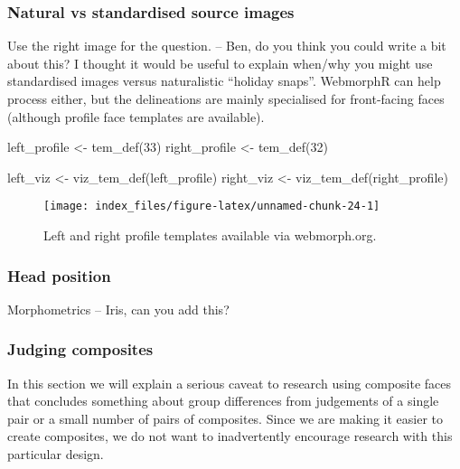 \documentclass[
  doc,floatsintext]{apa6}
\newenvironment{Shaded}{\begin{snugshade}}{\end{snugshade}}
\newcommand{\DecValTok}[1]{\textcolor[rgb]{0.00,0.00,0.81}{#1}}
\newcommand{\FunctionTok}[1]{\textcolor[rgb]{0.00,0.00,0.00}{#1}}
\newcommand{\NormalTok}[1]{#1}
\newcommand{\OtherTok}[1]{\textcolor[rgb]{0.56,0.35,0.01}{#1}}
\begin{document}
\hypertarget{natural-vs-standardised-source-images}{%
\subsubsection{Natural vs standardised source images}\label{natural-vs-standardised-source-images}}

Use the right image for the question. -- Ben, do you think you could write a bit about this? I thought it would be useful to explain when/why you might use standardised images versus naturalistic ``holiday snaps''. WebmorphR can help process either, but the delineations are mainly specialised for front-facing faces (although profile face templates are available).

\begin{Shaded}
\begin{Highlighting}[]
\NormalTok{left\_profile }\OtherTok{\textless{}{-}} \FunctionTok{tem\_def}\NormalTok{(}\DecValTok{33}\NormalTok{)}
\NormalTok{right\_profile }\OtherTok{\textless{}{-}} \FunctionTok{tem\_def}\NormalTok{(}\DecValTok{32}\NormalTok{)}

\NormalTok{left\_viz }\OtherTok{\textless{}{-}} \FunctionTok{viz\_tem\_def}\NormalTok{(left\_profile)}
\NormalTok{right\_viz }\OtherTok{\textless{}{-}} \FunctionTok{viz\_tem\_def}\NormalTok{(right\_profile)}
\end{Highlighting}
\end{Shaded}

\begin{figure}
\texttt{[image: index\_files/figure-latex/unnamed-chunk-24-1]} \caption{Left and right profile templates available via webmorph.org.}\label{fig:unnamed-chunk-24}
\end{figure}

\hypertarget{head-position}{%
\subsubsection{Head position}\label{head-position}}

Morphometrics -- Iris, can you add this?

\hypertarget{judging-composites}{%
\subsubsection{Judging composites}\label{judging-composites}}

In this section we will explain a serious caveat to research using composite faces that concludes something about group differences from judgements of a single pair or a small number of pairs of composites. Since we are making it easier to create composites, we do not want to inadvertently encourage research with this particular design.
\end{document}
